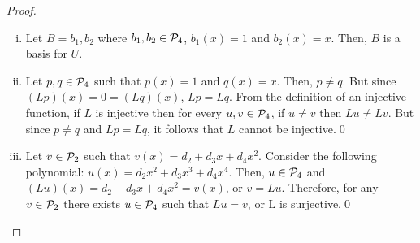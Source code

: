 \begin{proof}
\begin{enumerate}[(i)]
			  From (1), (2) and (3), it follows that $U$ is a subspace of $\P_4$.\qed
			  \item Let $B=b_1,b_2$ where $b_1,b_2\in\P_4$, $b_1(x)=1$ and $b_2(x)=x$. Then, $B$ is a basis for $U$.
			  \item Let $p,q\in\P_4$ such that $p(x)=1$ and $q(x)=x$. Then, $p\not=q$. But since $(Lp)(x)=0=(Lq)(x)$, $Lp=Lq$. From the definition of an injective function, if $L$ is injective then for every $u,v\in\P_4$, if $u\not=v$ then $Lu\not=Lv$. But since $p\not=q$ and $Lp=Lq$, it follows that $L$ cannot be injective.\qed
			  \item Let $v\in\P_2$ such that $v(x)=d_2+d_3x+d_4x^2$. 
			  Consider the following polynomial: $u(x)=d_2x^2+d_3x^3+d_4x^4$. Then, $u\in\P_4$ and $(Lu)(x)=d_2+d_3x+d_4x^2=v(x)$, or $v=Lu$. Therefore, for any $v\in\P_2$ there exists $u\in\P_4$ such that $Lu=v$, or L is surjective.\qed
	\end{enumerate}
	\renewcommand{\qedsymbol}{}
\end{proof}